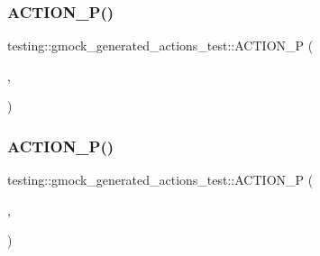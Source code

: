 \subsubsection{\texorpdfstring{ACTION\_P()}{ACTION\_P()}\hspace{0.1cm}{\footnotesize\ttfamily [5/6]}}
{\footnotesize\ttfamily testing\+::gmock\+\_\+generated\+\_\+actions\+\_\+test\+::\+A\+C\+T\+I\+O\+N\+\_\+P (\begin{DoxyParamCaption}\item[{\mbox{\hyperlink{namespacetesting_1_1gmock__generated__actions__test_a75e901c6d28c591c53a54320a294da55}{Plus1}}}]{,  }\item[{\mbox{\hyperlink{_obj__test_2lib_2googletest-master_2googlemock_2test_2gmock-matchers__test_8cc_a6150e0515f7202e2fb518f7206ed97dc}{x}}}]{ }\end{DoxyParamCaption})}

\mbox{\label{namespacetesting_1_1gmock__generated__actions__test_acae7628c76df0e3b54ea80459fe3cf60}} 
\subsubsection{\texorpdfstring{ACTION\_P()}{ACTION\_P()}\hspace{0.1cm}{\footnotesize\ttfamily [6/6]}}
{\footnotesize\ttfamily testing\+::gmock\+\_\+generated\+\_\+actions\+\_\+test\+::\+A\+C\+T\+I\+O\+N\+\_\+P (\begin{DoxyParamCaption}\item[{Return\+Sum}]{,  }\item[{\mbox{\hyperlink{_obj__test_2lib_2googletest-master_2googlemock_2test_2gmock-matchers__test_8cc_a6150e0515f7202e2fb518f7206ed97dc}{x}}}]{ }\end{DoxyParamCaption})}

\mbox{\label{namespacetesting_1_1gmock__generated__actions__test_a3c6e7ef6aefc94efc9e815e92f0b3e47}} 
